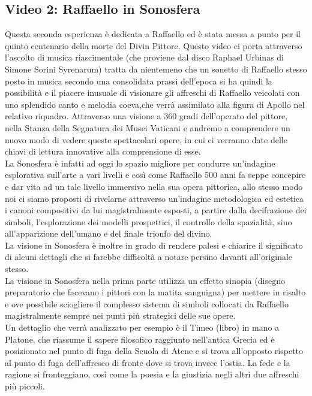 \documentclass[hidelinks,12pt,a4paper]{article}
\begin{document}
\begin{flushleft}
			\subsection{Video 2: Raffaello in Sonosfera}
			Questa seconda esperienza è dedicata a Raffaello ed è stata messa a punto per il quinto centenario della morte del Divin Pittore. Questo video ci porta attraverso l'ascolto di musica riascimentale (che proviene dal disco Raphael Urbinas di Simone Sorini Syrenarum) tratta da nientemeno che un sonetto di Raffaello stesso posto in musica secondo una consolidata prassi dell'epoca si ha quindi la possibilità e il piacere inusuale di  visionare gli affreschi di Raffaello veicolati con uno splendido canto e melodia coeva,che verrà assimilato alla figura di Apollo nel relativo riquadro.  Attraverso una visione a 360 gradi dell'operato del pittore, nella Stanza della Segnatura dei Musei Vaticani e andremo a comprendere un nuovo modo di vedere queste spettacolari opere, in cui ci verranno date delle chiavi di lettura innovative alla comprensione di esse.\\
			La Sonosfera è infatti ad oggi lo spazio migliore per condurre un'indagine esplorativa sull'arte a vari livelli e così come Raffaello 500 anni fa seppe concepire e dar vita ad un tale livello immersivo nella sua opera pittorica, allo stesso modo noi ci siamo proposti di rivelarne attraverso un'indagine metodologica ed estetica i canoni compositivi da lui magistralmente esposti, a partire dalla decifrazione dei simboli, l'esplorazione dei modelli prospettici, il controllo della spazialità, sino all'apparizione dell'umano e del finale trionfo del divino.\\
			La visione in Sonosfera è inoltre in grado di rendere palesi e chiarire il significato di alcuni dettagli che si farebbe difficoltà a notare persino davanti all'originale stesso.\\
			La visione in Sonosfera  nella prima parte utilizza un effetto sinopia (disegno preparatorio che facevano i pittori con la matita sanguigna) per mettere in risalto e ove possibile sciogliere il complesso sistema di simboli collocati da Raffaello magistralmente sempre nei punti più strategici delle sue opere.\\
			Un dettaglio che verrà analizzato per esempio è il Timeo (libro) in mano a Platone, che riassume il sapere filosofico raggiunto nell'antica Grecia ed è posizionato nel punto di fuga della Scuola di Atene e si trova all'opposto rispetto al punto di fuga dell'affresco di fronte dove si trova invece l'ostia. La fede e la ragione si fronteggiano, così come la poesia e la giustizia negli altri due affreschi più piccoli.\\

\end{flushleft}
\end{document}
